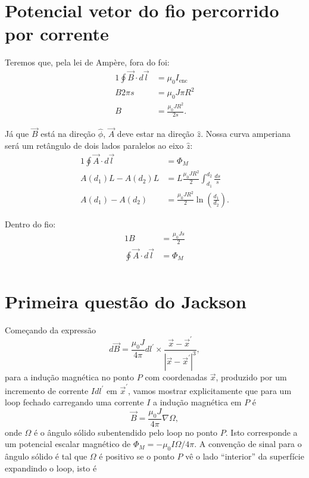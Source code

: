 \documentclass{article}
\begin{document}
\section{Potencial vetor do fio percorrido por corrente}
Teremos que, pela lei de Ampère, fora do foi:
\begin{alignat}{1}
 \oint \vec{B} \cdot d\vec{l} &= \mu_0 I_{\mathrm{enc}}\\
 B 2\pi s &= \mu_0 J \pi R^2\\
 B &= \frac{\mu_0 J R^2}{2 s}.
\end{alignat}

Já que $\vec{B}$ está na direção $\hat{\phi}$, $\vec{A}$ deve estar na direção $\hat{z}$. Nossa curva amperiana será um retângulo de dois lados paralelos ao eixo
$\hat{z}$:
\begin{alignat}{1}
 \oint \vec{A} \cdot d\vec{l} &= \Phi_M\\
 A(d_1)L - A(d_2)L &= L \frac{\mu_0 J R^2}{2} \int_{d_1}^{d_2} \frac{ds}{s}\\
 A(d_1) - A(d_2) &= \frac{\mu_0 J R^2}{2} \ln{\left(\frac{d_1}{d_2}\right)}.
\end{alignat}

Dentro do fio:
\begin{alignat}{1}
 B &= \frac{\mu_0 J s}{2}\\
 \oint \vec{A} \cdot d\vec{l} &= \Phi_M\\
\end{alignat}


\section{Primeira questão do Jackson}
Começando da expressão
\begin{equation}
 d\vec{B} = \frac{\mu_0J}{4\pi}dl^{\prime} \times \frac{\vec{x} - \vec{x}^{\prime}}{\left| \vec{x} - \vec{x}^{\prime}\right|^3},
\end{equation}
para a indução magnética no ponto $P$ com coordenadas $\vec{x}$, produzido por um incremento de corrente $Idl^{\prime}$ em $\vec{x}^{\prime}$, vamos mostrar
explicitamente que para um loop fechado carregando uma corrente $I$ a indução magnética em $P$ é
\begin{equation}
 \vec{B} = \frac{\mu_0J}{4\pi}\nabla\Omega,
\end{equation}
onde $\Omega$ é o ângulo sólido subentendido pelo loop no ponto $P$. Isto corresponde a um potencial  escalar magnético de $\Phi_M = -\mu_0I\Omega\slash4\pi$. A
convenção de sinal para o ângulo sólido é tal que $\Omega$ é positivo se o ponto $P$ vê o lado ``interior'' da superfície expandindo o loop, isto é 
\end{document}
